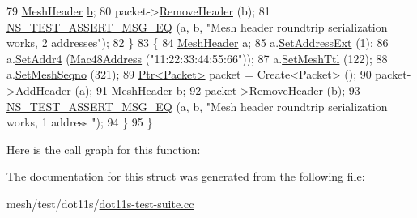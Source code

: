 \begin{DoxyCode}
79     \hyperlink{classns3_1_1dot11s_1_1MeshHeader}{MeshHeader} \hyperlink{buildings__pathloss_8m_a21ad0bd836b90d08f4cf640b4c298e7c}{b};
80     packet->\hyperlink{classns3_1_1Packet_a0961eccf975d75f902d40956c93ba63e}{RemoveHeader} (b);
81     \hyperlink{group__testing_ga2a9d78cffb3db8e867c35fff0b698cf5}{NS\_TEST\_ASSERT\_MSG\_EQ} (a, b, \textcolor{stringliteral}{"Mesh header roundtrip serialization works, 2
       addresses"});
82   \}
83   \{
84     \hyperlink{classns3_1_1dot11s_1_1MeshHeader}{MeshHeader} a;
85     a.\hyperlink{classns3_1_1dot11s_1_1MeshHeader_aa1620c61386f3bb4601e3250a25bab3f}{SetAddressExt} (1);
86     a.\hyperlink{classns3_1_1dot11s_1_1MeshHeader_acd4f196e526875a606381c9cb950d725}{SetAddr4} (\hyperlink{classns3_1_1Mac48Address}{Mac48Address} (\textcolor{stringliteral}{"11:22:33:44:55:66"}));
87     a.\hyperlink{classns3_1_1dot11s_1_1MeshHeader_a415c88e6de2716bd6d10bbb848a80c90}{SetMeshTtl} (122);
88     a.\hyperlink{classns3_1_1dot11s_1_1MeshHeader_a120bb1f7c7e741bd518a8973b870685a}{SetMeshSeqno} (321);
89     \hyperlink{classns3_1_1Ptr}{Ptr<Packet>} packet = Create<Packet> ();
90     packet->\hyperlink{classns3_1_1Packet_a465108c595a0bc592095cbcab1832ed8}{AddHeader} (a);
91     \hyperlink{classns3_1_1dot11s_1_1MeshHeader}{MeshHeader} \hyperlink{buildings__pathloss_8m_a21ad0bd836b90d08f4cf640b4c298e7c}{b};
92     packet->\hyperlink{classns3_1_1Packet_a0961eccf975d75f902d40956c93ba63e}{RemoveHeader} (b);
93     \hyperlink{group__testing_ga2a9d78cffb3db8e867c35fff0b698cf5}{NS\_TEST\_ASSERT\_MSG\_EQ} (a, b, \textcolor{stringliteral}{"Mesh header roundtrip serialization works, 1 address
      "});
94   \}
95 \}
\end{DoxyCode}


Here is the call graph for this function\+:




The documentation for this struct was generated from the following file\+:\begin{DoxyCompactItemize}
\item 
mesh/test/dot11s/\hyperlink{dot11s-test-suite_8cc}{dot11s-\/test-\/suite.\+cc}\end{DoxyCompactItemize}

